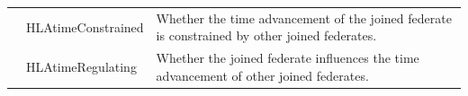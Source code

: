 \begin{landscape}
\begin{momtabletypeset}[8.00]
{{\begin{tabular}{|Y{111.42pt}|Y{128.60pt}|Y{393.21pt}|}
                    & HLAtimeConstrained                           & Whether the time advancement of the joined federate is constrained by other joined federates.\allowbreak{}                                                                                                                                             \\
                    & HLAtimeRegulating                            & Whether the joined federate influences the time advancement of other joined federates.\allowbreak{}                                                                                                                                                    \\
                    \hline
                \end{tabular}%
            }%
        }%
    \end{momtabletypeset}
    \newpage


\end{landscape}
